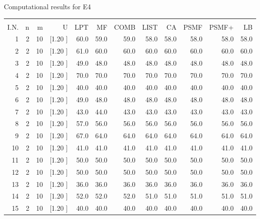 \documentclass[12pt,a4paper]{article}
\begin{document}
\newpage
\begin{center}
 Computational results for E4 {\tiny
\begin{tabular}{r r r r r r r r r r r r}\hline
    &   &   &          &        &        &        &        &        &        &        &       \\[-0.1in]
  I.N.  &  n  &  m  &  U  &  LPT  &  MF  &  COMB  &  LIST  &  CA  & PSMF &PSMF+ & LB \\[0.03in]
\hline
   1&  2& 10&[1.20      ]&    60.0&    59.0&    59.0&    58.0&    58.0&    58.0&    58.0&    58.0\\[-0.02in]
   2&  2& 10&[1.20      ]&    61.0&    60.0&    60.0&    60.0&    60.0&    60.0&    60.0&    60.0\\[-0.02in]
   3&  2& 10&[1.20      ]&    49.0&    48.0&    48.0&    48.0&    48.0&    48.0&    48.0&    48.0\\[-0.02in]
   4&  2& 10&[1.20      ]&    70.0&    70.0&    70.0&    70.0&    70.0&    70.0&    70.0&    70.0\\[-0.02in]
   5&  2& 10&[1.20      ]&    40.0&    40.0&    40.0&    40.0&    40.0&    40.0&    40.0&    40.0\\[-0.02in]
   6&  2& 10&[1.20      ]&    49.0&    48.0&    48.0&    48.0&    48.0&    48.0&    48.0&    48.0\\[-0.02in]
   7&  2& 10&[1.20      ]&    43.0&    44.0&    43.0&    43.0&    43.0&    43.0&    43.0&    43.0\\[-0.02in]
   8&  2& 10&[1.20      ]&    57.0&    56.0&    56.0&    56.0&    56.0&    56.0&    56.0&    56.0\\[-0.02in]
   9&  2& 10&[1.20      ]&    67.0&    64.0&    64.0&    64.0&    64.0&    64.0&    64.0&    64.0\\[-0.02in]
  10&  2& 10&[1.20      ]&    41.0&    41.0&    41.0&    41.0&    41.0&    41.0&    41.0&    41.0\\[-0.02in]
  11&  2& 10&[1.20      ]&    50.0&    50.0&    50.0&    50.0&    50.0&    50.0&    50.0&    50.0\\[-0.02in]
  12&  2& 10&[1.20      ]&    50.0&    50.0&    50.0&    50.0&    50.0&    50.0&    50.0&    50.0\\[-0.02in]
  13&  2& 10&[1.20      ]&    36.0&    36.0&    36.0&    36.0&    36.0&    36.0&    36.0&    36.0\\[-0.02in]
  14&  2& 10&[1.20      ]&    52.0&    52.0&    52.0&    51.0&    51.0&    51.0&    51.0&    51.0\\[-0.02in]
  15&  2& 10&[1.20      ]&    40.0&    40.0&    40.0&    40.0&    40.0&    40.0&    40.0&    40.0\\[-0.02in]

\end{tabular}}
\end{center}
\end{document}
